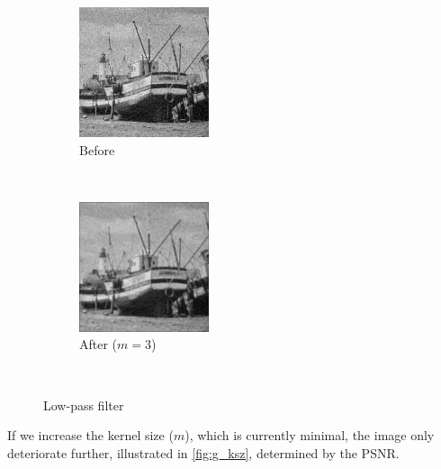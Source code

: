 \documentclass[12pt]{article}
\begin{document}
\begin{figure}[ht!]
    \centering
    \begin{subfigure}[t]{0.3\textwidth}
        \centering
        \includegraphics[height=1.5in]{images/G1}
        \caption{Before}
    \end{subfigure}%
    ~ 
    \begin{subfigure}[t]{0.3\textwidth}
        \centering
        \includegraphics[height=1.5in]{images/Rg}
        \caption{After ($m=3$)}
    \end{subfigure}%
    ~
    \caption{Low-pass filter}
\end{figure}

If we increase the kernel size ($m$), which is currently minimal, the image only deteriorate further, illustrated in \autoref{fig:g_ksz}, determined by the PSNR.
\end{document}
